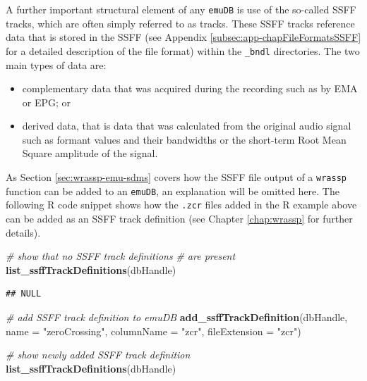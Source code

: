 \documentclass[]{book}
\newenvironment{Shaded}{\begin{snugshade}}{\end{snugshade}}
\newcommand{\CommentTok}[1]{\textcolor[rgb]{0.56,0.35,0.01}{\textit{#1}}}
\newcommand{\DataTypeTok}[1]{\textcolor[rgb]{0.13,0.29,0.53}{#1}}
\newcommand{\KeywordTok}[1]{\textcolor[rgb]{0.13,0.29,0.53}{\textbf{#1}}}
\newcommand{\NormalTok}[1]{#1}
\newcommand{\StringTok}[1]{\textcolor[rgb]{0.31,0.60,0.02}{#1}}
\providecommand{\tightlist}{%
  \setlength{\itemsep}{0pt}\setlength{\parskip}{0pt}}
\begin{document}
A further important structural element of any \texttt{emuDB} is use of the so-called SSFF tracks, which are often simply referred to as tracks. These SSFF tracks reference data that is stored in the SSFF (see Appendix \ref{subsec:app-chapFileFormatsSSFF} for a detailed description of the file format) within the \texttt{\_bndl} directories. The two main types of data are:

\begin{itemize}
\tightlist
\item
  complementary data that was acquired during the recording such as by EMA or EPG; or
\item
  derived data, that is data that was calculated from the original audio signal such as formant values and their bandwidths or the short-term Root Mean Square amplitude of the signal.
\end{itemize}

As Section \ref{sec:wrassp-emu-sdms} covers how the SSFF file output of a \texttt{wrassp} function can be added to an \texttt{emuDB}, an explanation will be omitted here. The following R code snippet shows how the \texttt{.zcr} files added in the R example above can be added as an SSFF track definition (see Chapter \ref{chap:wrassp} for further details).

\begin{Shaded}
\begin{Highlighting}[]
\CommentTok{# show that no SSFF track definitions}
\CommentTok{# are present}
\KeywordTok{list_ssffTrackDefinitions}\NormalTok{(dbHandle)}
\end{Highlighting}
\end{Shaded}

\begin{verbatim}
## NULL
\end{verbatim}

\begin{Shaded}
\begin{Highlighting}[]
\CommentTok{# add SSFF track definition to emuDB}
\KeywordTok{add_ssffTrackDefinition}\NormalTok{(dbHandle,}
                        \DataTypeTok{name =} \StringTok{"zeroCrossing"}\NormalTok{,}
                        \DataTypeTok{columnName =} \StringTok{"zcr"}\NormalTok{,}
                        \DataTypeTok{fileExtension =} \StringTok{"zcr"}\NormalTok{)}

\CommentTok{# show newly added SSFF track definition}
\KeywordTok{list_ssffTrackDefinitions}\NormalTok{(dbHandle)}
\end{Highlighting}
\end{Shaded}
\end{document}
